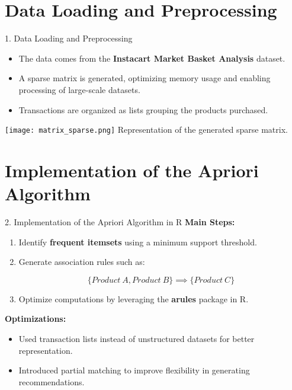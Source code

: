 \documentclass{beamer}
\begin{document}
\section{Data Loading and Preprocessing}

\begin{frame}{1. Data Loading and Preprocessing}
    \begin{itemize}
        \item The data comes from the \textbf{Instacart Market Basket Analysis} dataset.
        \item A sparse matrix is generated, optimizing memory usage and enabling processing of large-scale datasets.
        \item Transactions are organized as lists grouping the products purchased.
    \end{itemize}
    \begin{center}
        \texttt{[image: matrix\_sparse.png]} %
        \newline
        Representation of the generated sparse matrix.
    \end{center}
\end{frame}

\section{Implementation of the Apriori Algorithm}

\begin{frame}{2. Implementation of the Apriori Algorithm in R}
    \textbf{Main Steps:}
    \begin{enumerate}
        \item Identify \textbf{frequent itemsets} using a minimum support threshold.
        \item Generate association rules such as:
        

\[ \{Product\ A, Product\ B\} \implies \{Product\ C\} \]


        \item Optimize computations by leveraging the \textbf{arules} package in R.
    \end{enumerate}

    \vspace{1em}
    \textbf{Optimizations:}
    \begin{itemize}
        \item Used transaction lists instead of unstructured datasets for better representation.
        \item Introduced partial matching to improve flexibility in generating recommendations.
    \end{itemize}
\end{frame}
\end{document}
